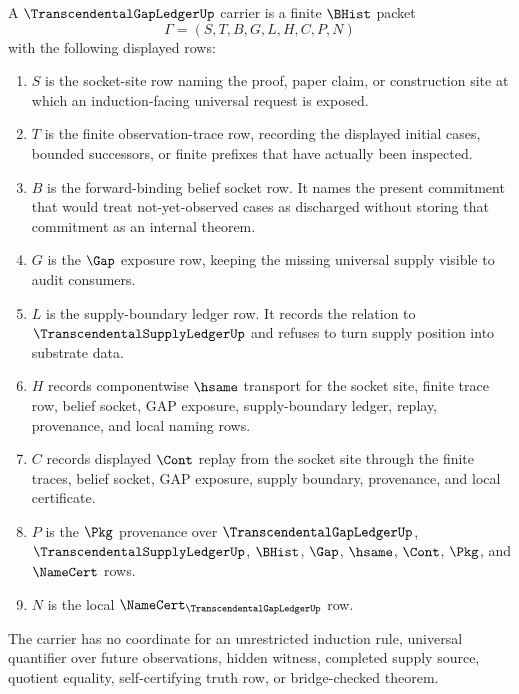 \begin{definition}
\label{def:transcendental-gap-ledger-carrier}
A $\TranscendentalGapLedgerUp$ carrier is a finite $\BHist$ packet
$$
\Gamma=(S,T,B,G,L,H,C,P,N)
$$
with the following displayed rows:
\begin{enumerate}
\item $S$ is the socket-site row naming the proof, paper claim, or construction site at which an induction-facing universal request is exposed.
\item $T$ is the finite observation-trace row, recording the displayed initial cases, bounded successors, or finite prefixes that have actually been inspected.
\item $B$ is the forward-binding belief socket row. It names the present commitment that would treat not-yet-observed cases as discharged without storing that commitment as an internal theorem.
\item $G$ is the $\Gap$ exposure row, keeping the missing universal supply visible to audit consumers.
\item $L$ is the supply-boundary ledger row. It records the relation to $\TranscendentalSupplyLedgerUp$ and refuses to turn supply position into substrate data.
\item $H$ records componentwise $\hsame$ transport for the socket site, finite trace row, belief socket, GAP exposure, supply-boundary ledger, replay, provenance, and local naming rows.
\item $C$ records displayed $\Cont$ replay from the socket site through the finite traces, belief socket, GAP exposure, supply boundary, provenance, and local certificate.
\item $P$ is the $\Pkg$ provenance over $\TranscendentalGapLedgerUp$, $\TranscendentalSupplyLedgerUp$, $\BHist$, $\Gap$, $\hsame$, $\Cont$, $\Pkg$, and $\NameCert$ rows.
\item $N$ is the local $\NameCert_{\TranscendentalGapLedgerUp}$ row.
\end{enumerate}
The carrier has no coordinate for an unrestricted induction rule, universal quantifier over future observations, hidden witness, completed supply source, quotient equality, self-certifying truth row, or bridge-checked theorem.
\end{definition}

